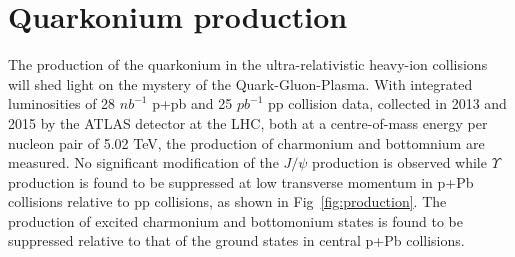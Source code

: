 \documentclass[epj]{webofc}
\begin{document}
\section{Quarkonium production} 

The production of the quarkonium in the ultra-relativistic heavy-ion collisions will shed light on the mystery of the Quark-Gluon-Plasma.
With integrated luminosities of 28 $nb^{-1}$ p+pb and 25 $pb^{-1}$ pp collision data, collected in 2013 and 2015 by the ATLAS detector at the LHC, both 
at a centre-of-mass energy per nucleon pair of 5.02 TeV, the production of charmonium and bottomnium are measured. 
No significant modification of the $J/\psi$ production is observed while $\Upsilon$ production is 
found to be suppressed at low transverse momentum in p+Pb collisions relative to pp collisions, as shown in
Fig~\ref{fig:production}. 
The production of excited charmonium and bottomonium states is found to be suppressed relative to that of the ground states in central p+Pb collisions.
\end{document}
